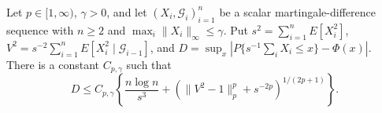 Let \(p\in[1,\infty)\), \(\gamma>0\), and let \((X_i,\mathcal G_i)_{i=1}^n\) be a scalar martingale-difference sequence with \(n\ge2\) and \(\max_i\|X_i\|_\infty\le\gamma\). Put \(s^2=\sum_{i=1}^nE[X_i^2]\), \(V^2=s^{-2}\sum_{i=1}^nE[X_i^2\mid\mathcal G_{i-1}]\), and \(D=\sup_x|P\{s^{-1}\sum_iX_i\le x\}-\Phi(x)|\). There is a constant \(C_{p,\gamma}\) such that
\[
D\le C_{p,\gamma}\left\{\frac{n\log n}{s^3}+\left(\|V^2-1\|_p^p+s^{-2p}\right)^{1/(2p+1)}\right\}.
\]